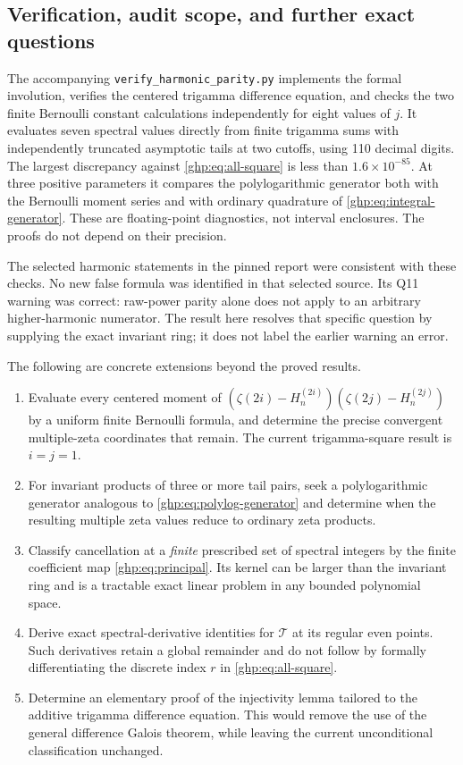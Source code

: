 \subsection{Verification, audit scope, and further exact questions}

The accompanying \texttt{verify\_harmonic\_parity.py} implements the
formal involution, verifies the centered trigamma difference equation,
and checks the two finite Bernoulli constant calculations independently
for eight values of $j$. It evaluates seven spectral values directly
from finite trigamma sums with independently truncated asymptotic tails
at two cutoffs, using 110 decimal digits. The largest discrepancy
against \eqref{ghp:eq:all-square} is less than $1.6\times10^{-85}$.
At three positive parameters it compares the polylogarithmic generator
both with the Bernoulli moment series and with ordinary quadrature of
\eqref{ghp:eq:integral-generator}. These are floating-point diagnostics,
not interval enclosures. The proofs do not depend on their precision.

The selected harmonic statements in the pinned report were consistent
with these checks. No new false formula was identified in that selected
source. Its Q11 warning was correct: raw-power parity alone does not
apply to an arbitrary higher-harmonic numerator. The result here
resolves that specific question by supplying the exact invariant ring;
it does not label the earlier warning an error.

The following are concrete extensions beyond the proved results.
\begin{enumerate}
\item Evaluate every centered moment of
$(\zeta(2i)-H_n^{(2i)})(\zeta(2j)-H_n^{(2j)})$ by a uniform finite
Bernoulli formula, and determine the precise convergent multiple-zeta
coordinates that remain. The current trigamma-square result is
$i=j=1$.
\item For invariant products of three or more tail pairs, seek a
polylogarithmic generator analogous to \eqref{ghp:eq:polylog-generator}
and determine when the resulting multiple zeta values reduce to
ordinary zeta products.
\item Classify cancellation at a \emph{finite} prescribed set of
spectral integers by the finite coefficient map
\eqref{ghp:eq:principal}. Its kernel can be larger than the invariant
ring and is a tractable exact linear problem in any bounded polynomial
space.
\item Derive exact spectral-derivative identities for $\mathcal T$
at its regular even points. Such derivatives retain a global remainder
and do not follow by formally differentiating the discrete index $r$
in \eqref{ghp:eq:all-square}.
\item Determine an elementary proof of the injectivity lemma tailored
to the additive trigamma difference equation. This would remove the
use of the general difference Galois theorem, while leaving the current
unconditional classification unchanged.
\end{enumerate}
